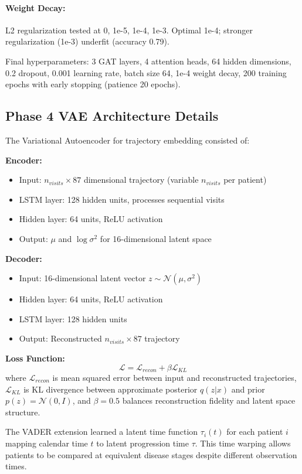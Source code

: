 \documentclass[11pt]{article}
\begin{document}
\paragraph{Weight Decay:} L2 regularization tested at 0, 1e-5, 1e-4, 1e-3. Optimal 1e-4; stronger regularization (1e-3) underfit (accuracy 0.79).

Final hyperparameters: 3 GAT layers, 4 attention heads, 64 hidden dimensions, 0.2 dropout, 0.001 learning rate, batch size 64, 1e-4 weight decay, 200 training epochs with early stopping (patience 20 epochs).

\subsection{Phase 4 VAE Architecture Details}

The Variational Autoencoder for trajectory embedding consisted of:

\textbf{Encoder:}
\begin{itemize}
    \item Input: $n_{visits} \times 87$ dimensional trajectory (variable $n_{visits}$ per patient)
    \item LSTM layer: 128 hidden units, processes sequential visits
    \item Hidden layer: 64 units, ReLU activation
    \item Output: $\mu$ and $\log \sigma^2$ for 16-dimensional latent space
\end{itemize}

\textbf{Decoder:}
\begin{itemize}
    \item Input: 16-dimensional latent vector $z \sim \mathcal{N}(\mu, \sigma^2)$
    \item Hidden layer: 64 units, ReLU activation
    \item LSTM layer: 128 hidden units
    \item Output: Reconstructed $n_{visits} \times 87$ trajectory
\end{itemize}

\textbf{Loss Function:}
$$\mathcal{L} = \mathcal{L}_{recon} + \beta \mathcal{L}_{KL}$$
where $\mathcal{L}_{recon}$ is mean squared error between input and reconstructed trajectories, $\mathcal{L}_{KL}$ is KL divergence between approximate posterior $q(z|x)$ and prior $p(z) = \mathcal{N}(0, I)$, and $\beta = 0.5$ balances reconstruction fidelity and latent space structure.

The VADER extension learned a latent time function $\tau_i(t)$ for each patient $i$ mapping calendar time $t$ to latent progression time $\tau$. This time warping allows patients to be compared at equivalent disease stages despite different observation times.
\end{document}
